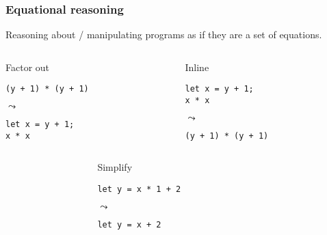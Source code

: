 \documentclass[t]{beamer}
\begin{document}
\begin{frame}[fragile]
\frametitle{Equational reasoning}

Reasoning about / manipulating programs as if they are a set of equations.

\begin{columns}

\begin{column}[T]{0.48\textwidth}
\begin{block}{Factor out}
\begin{verbatim}
(y + 1) * (y + 1)
\end{verbatim}

\(\leadsto\)

\begin{verbatim}
let x = y + 1;
x * x
\end{verbatim}
\end{block}
\end{column}

\begin{column}[T]{0.48\textwidth}
\begin{block}{Inline}
\begin{verbatim}
let x = y + 1;
x * x
\end{verbatim}

\(\leadsto\)

\begin{verbatim}
(y + 1) * (y + 1)
\end{verbatim}
\end{block}
\end{column}

\end{columns}

\begin{columns}

\begin{column}[T]{0.24\textwidth}
\end{column}

\begin{column}[T]{0.48\textwidth}
\begin{block}{Simplify}
\begin{verbatim}
let y = x * 1 + 2
\end{verbatim}

\(\leadsto\)

\begin{verbatim}
let y = x + 2
\end{verbatim}
\end{block}
\end{column}

\begin{column}[T]{0.24\textwidth}
\end{column}

\end{columns}

\end{frame}
\end{document}
